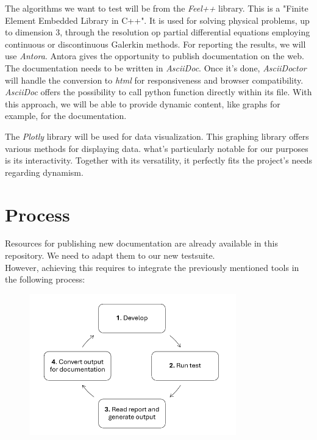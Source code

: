 \documentclass[12pt]{article}
\begin{document}
The algorithms we want to test will be from the \textit{Feel++}\cite*{Feelpp} library.
This is a "Finite Element Embedded Library in C++". It is used for solving physical problems, up to dimension 3,
through the resolution op partial differential equations employing continuous or discontinuous Galerkin methods.
\newpage
For reporting the results, we will use \textit{Antora}\cite*{Antora}. Antora gives the opportunity to publish documentation on the web.
The documentation needs to be written in \textit{AsciiDoc}. Once it's done, \textit{AsciiDoctor} will handle the conversion to \textit{html}
for responsiveness and browser compatibility.
\textit{AsciiDoc} offers the possibility to call python function directly within its file. With this approach, we will be able to provide dynamic content,
like graphs for example, for the documentation.

The \textit{Plotly}\cite*{Plotly} library will be used for data visualization. This graphing library offers various methods for displaying data.
what's particularly notable for our purposes is its interactivity. Together with its versatility, it perfectly fits the project's needs
regarding dynamism.


\section{Process}
Resources for publishing new documentation are already available in this repository. We need to adapt them to our new testsuite.\\
However, achieving this requires to integrate the previously mentioned tools in the following process:

\begin{figure}[h]
    \centering
    \includegraphics[width=0.8\textwidth]{../illustrations/process.png}
\end{figure}
\end{document}

